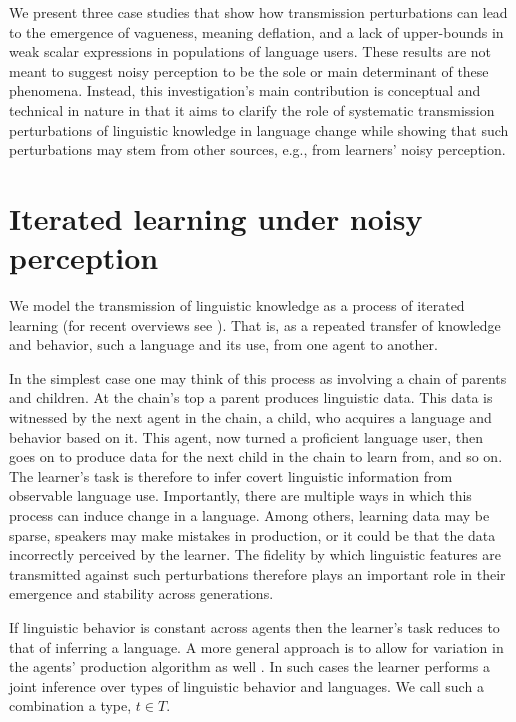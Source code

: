 \documentclass[10pt,a4paper]{article}
\begin{document}
We present three case studies that show how transmission perturbations can lead to the emergence of vagueness, meaning deflation, and a lack of upper-bounds in weak scalar expressions in populations of language users. These results are not meant to suggest noisy perception to be the sole or main determinant of these phenomena. Instead, this investigation's main contribution is conceptual and technical in nature in that it aims to clarify the role of systematic transmission perturbations of linguistic knowledge in language change while showing that such perturbations may stem from other sources, e.g., from learners' noisy perception.


\section{Iterated learning under noisy perception}
We model the transmission of linguistic knowledge as a process of iterated learning (for recent overviews see \citealt{kirby+etal:2014, tamariz+kirby:2016}). That is, as a repeated transfer of knowledge and behavior, such a language and its use, from one agent to another. 

In the simplest case one may think of this process as involving a chain of parents and children. At the chain's top a parent produces linguistic data. This data is witnessed by the next agent in the chain, a child, who acquires a language and behavior based on it. This agent, now turned a proficient language user, then goes on to produce data for the next child in the chain to learn from, and so on. The learner's task is therefore to infer covert linguistic information from observable language use. Importantly, there are multiple ways in which this process can induce change in a language. Among others, learning data may be sparse, speakers may make mistakes in production, or it could be that the data incorrectly perceived by the learner. The fidelity by which linguistic features are transmitted against such perturbations therefore plays an important role in their emergence and stability across generations.

If linguistic behavior is constant across agents then the learner's task reduces to that of inferring a language. A more general approach is to allow for variation in the agents' production algorithm as well \citep{brochhagen+etal:2016:CogSci}. In such cases the learner performs a joint inference over types of linguistic behavior and languages. We call such a combination a type, $t \in T$. 
\end{document}
